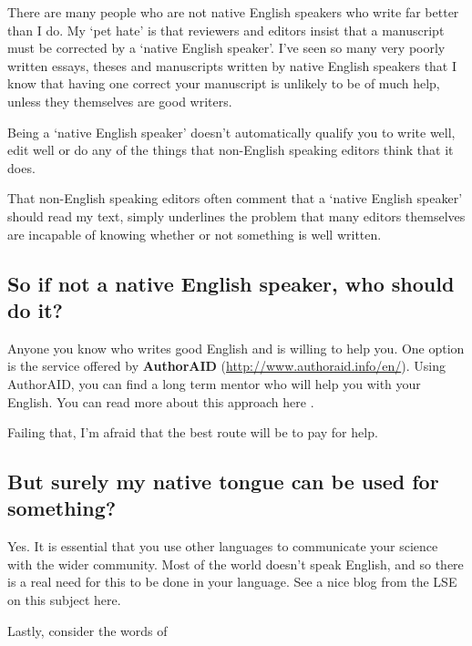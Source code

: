 \documentclass[
]{krantz}
\begin{document}
There are many people who are not native English speakers who write far better than I do. My `pet hate' is that reviewers and editors insist that a manuscript must be corrected by a `native English speaker'. I've seen so many very poorly written essays, theses and manuscripts written by native English speakers that I know that having one correct your manuscript is unlikely to be of much help, unless they themselves are good writers.

Being a `native English speaker' doesn't automatically qualify you to write well, edit well or do any of the things that non-English speaking editors think that it does.

That non-English speaking editors often comment that a `native English speaker' should read my text, simply underlines the problem that many editors themselves are incapable of knowing whether or not something is well written.

\hypertarget{so-if-not-a-native-english-speaker-who-should-do-it}{%
\subsection{So if not a native English speaker, who should do it?}\label{so-if-not-a-native-english-speaker-who-should-do-it}}

Anyone you know who writes good English and is willing to help you. One option is the service offered by \textbf{AuthorAID} (\url{http://www.authoraid.info/en/}). Using AuthorAID, you can find a long term mentor who will help you with your English. You can read more about this approach here \citep{freeman2006publishing}.

Failing that, I'm afraid that the best route will be to pay for help.

\hypertarget{but-surely-my-native-tongue-can-be-used-for-something}{%
\subsection{But surely my native tongue can be used for something?}\label{but-surely-my-native-tongue-can-be-used-for-something}}

Yes. It is essential that you use other languages to communicate your science with the wider community. Most of the world doesn't speak English, and so there is a real need for this to be done in your language. See a nice blog from the LSE on this subject here.

Lastly, consider the words of
\end{document}
